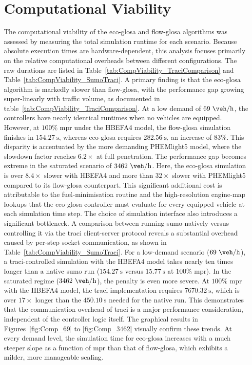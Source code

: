 \section{Computational Viability}
\label{sec:Results_Computational}

The computational viability of the \ac{eco-glosa} and \ac{flow-glosa} algorithms was assessed by measuring the total simulation runtime for each scenario. Because absolute execution times are hardware-dependent, this analysis focuses primarily on the relative computational overheads between different configurations. The raw durations are listed in Table~\vref{tab:CompViability_TraciComparison} and Table~\vref{tab:CompViability_SumoTraci}.
\mynewline
A primary finding is that the \ac{eco-glosa} algorithm is markedly slower than \ac{flow-glosa}, with the performance gap growing super-linearly with traffic volume, as documented in table~\vref{tab:CompViability_TraciComparison}. At a low demand of $69~\unit{\veh\per\hour}$, the controllers have nearly identical runtimes when no vehicles are equipped. However, at $100\%$ \ac{mpr} under the HBEFA4 model, the \ac{flow-glosa} simulation finishes in $154.27~\unit{\second}$, whereas \ac{eco-glosa} requires $282.56~\unit{\second}$, an increase of $83\%$. This disparity is accentuated by the more demanding PHEMlight5 model, where the slowdown factor reaches $6.2\times$ at full penetration. The performance gap becomes extreme in the saturated scenario of $3462~\unit{\veh\per\hour}$. Here, the \ac{eco-glosa} simulation is over $8.4\times$ slower with HBEFA4 and more than $32\times$ slower with PHEMlight5 compared to its \ac{flow-glosa} counterpart. This significant additional cost is attributable to the fuel-minimisation routine and the high-resolution engine-map lookups that the \ac{eco-glosa} controller must evaluate for every equipped vehicle at each simulation time step.
\mynewline
The choice of simulation interface also introduces a significant bottleneck. A comparison between running \ac{sumo} natively versus controlling it via the \ac{traci} client-server protocol reveals a substantial overhead caused by per-step socket communication, as shown in Table~\vref{tab:CompViability_SumoTraci}. For a low-demand scenario ($69~\unit{\veh\per\hour}$), a \ac{traci}-controlled simulation with the HBEFA4 model takes nearly ten times longer than a native \ac{sumo} run ($154.27~\unit{\second}$ versus $15.77~\unit{\second}$ at $100\%$ \ac{mpr}). In the saturated regime ($3462~\unit{\veh\per\hour}$), the penalty is even more severe. At $100\%$ \ac{mpr} with the HBEFA4 model, the \ac{traci} implementation requires $7670.32~\unit{\second}$, which is over $17\times$ longer than the $450.10~\unit{\second}$ needed for the native run. This demonstrates that the communication overhead of \ac{traci} is a major performance consideration, independent of the controller logic itself.
\mynewline
The graphical results in Figures~\vref{fig:Comp_69} to \vref{fig:Comp_3462} visually confirm these trends. At every demand level, the simulation time for \ac{eco-glosa} increases with a much steeper slope as a function of \ac{mpr} than that of \ac{flow-glosa}, which exhibits a milder, more manageable scaling.

